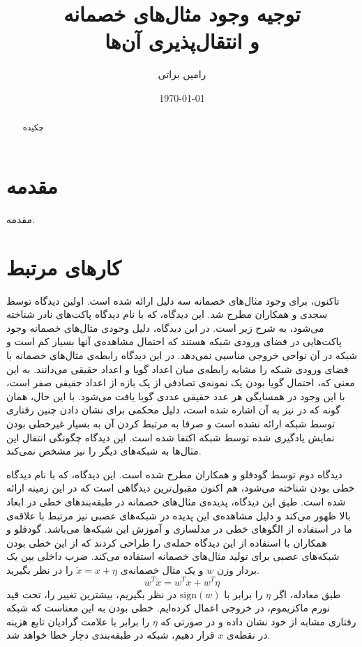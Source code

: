 \documentclass[12pt,onecolumn,a4paper]{article}
\begin{document}
\title{توجیه وجود مثال‌های خصمانه \\ و انتقال‌پذیری آن‌ها} 
\author{رامین براتی}
\date{\today}
\maketitle

\begin{abstract}
چکیده
\end{abstract}

\section{مقدمه} 
مقدمه.

\section{کارهای مرتبط}
تاکنون، برای وجود مثال‌های خصمانه سه دلیل ارائه شده است. اولین دیدگاه توسط سجدی و همکاران\cite{szegedy2013intriguing}
مطرح شد. این دیدگاه، که با نام دیدگاه پاکت‌های نادر شناخته می‌شود، به شرح زیر است. در این دیدگاه، دلیل وجودی مثال‌های خصمانه وجود پاکت‌هایی در فضای ورودی شبکه هستند که احتمال مشاهده‌ی آنها بسیار کم است و شبکه در آن نواحی خروجی مناسبی نمی‌دهد. در این دیدگاه رابطه‌ی مثال‌های خصمانه با فضای ورودی شبکه را مشابه رابطه‌ی میان اعداد گویا و اعداد حقیقی می‌دانند. به این معنی که، احتمال گویا بودن یک نمونه‌ی تصادفی از یک بازه از اعداد حقیقی صفر است، با این وجود در همسایگی هر عدد حقیقی عددی گویا یافت می‌شود. با این حال،
همان گونه که در
\cite{tanay2016boundary}
نیز به آن اشاره شده است، دلیل محکمی برای نشان دادن چنین رفتاری توسط شبکه ارائه نشده است و صرفا به مرتبط کردن آن به بسیار غیرخطی بودن نمایش یادگیری شده توسط شبکه اکتفا شده است. این دیدگاه چگونگی انتقال این مثال‌ها به شبکه‌های دیگر را نیز مشخص نمی‌کند.

دیدگاه دوم توسط گودفلو و همکاران\cite{goodfellow2014explaining}
مطرح شده است. این دیدگاه، که با نام دیدگاه خطی بودن شناخته می‌شود، هم اکنون مقبول‌ترین دیدگاهی است که در این زمینه ارائه شده است. طبق این دیدگاه، پدیده‌ی مثال‌های خصمانه در طبقه‌بندهای خطی در ابعاد بالا ظهور می‌کند و دلیل مشاهده‌ی این پدیده در شبکه‌های عصبی نیز مرتبط با علاقه‌ی ما در استفاده از الگوهای خطی در مدلسازی و آموزش این شبکه‌ها می‌باشد. گودفلو و همکاران با استفاده از این دیدگاه حمله‌ی
را طراحی کردند که از این خطی بودن شبکه‌های عصبی برای تولید مثال‌های خصمانه استفاده می‌کند. ضرب داخلی بین یک بردار وزن $w$ و یک مثال خصمانه‌ی $\tilde{x}=x+\eta$ را در نظر بگیرید.
\begin{equation*}
w^T\tilde{x}=w^Tx+w^T\eta
\end{equation*}
طبق معادله، اگر $\eta$ را برابر با $\mathrm{sign}(w)$ در نظر بگیریم، بیشترین تغییر را، تحت قید نورم ماکزیموم، در خروجی اعمال کرده‌ایم. خطی بودن به این معناست که شبکه رفتاری مشابه از خود نشان داده و در صورتی که $\eta$ را برابر با علامت گرادیان تابع هزینه در نقطه‌ی $x$ قرار دهیم، شبکه در طبقه‌بندی دچار خطا خواهد شد.
\end{document}
